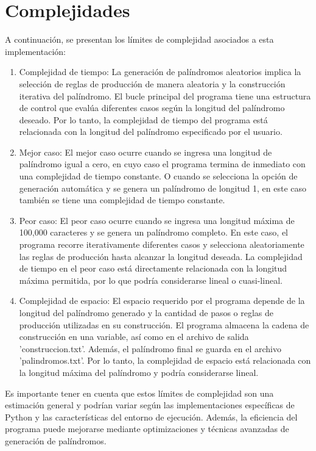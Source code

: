\section{Complejidades}
A continuación, se presentan los límites de complejidad asociados a esta implementación:
\begin{enumerate}
    
\item Complejidad de tiempo: La generación de palíndromos aleatorios implica la selección de reglas de producción de manera aleatoria y la construcción iterativa del palíndromo. El bucle principal del programa tiene una estructura de control que evalúa diferentes casos según la longitud del palíndromo deseado. Por lo tanto, la complejidad de tiempo del programa está relacionada con la longitud del palíndromo especificado por el usuario.\newline

\item Mejor caso: El mejor caso ocurre cuando se ingresa una longitud de palíndromo igual a cero, en cuyo caso el programa termina de inmediato con una complejidad de tiempo constante. O cuando se selecciona la opción de generación automática y se genera un palíndromo de longitud 1, en este caso también se tiene una complejidad de tiempo constante.\newline

\item Peor caso: El peor caso ocurre cuando se ingresa una longitud máxima de 100,000 caracteres y se genera un palíndromo completo. En este caso, el programa recorre iterativamente diferentes casos y selecciona aleatoriamente las reglas de producción hasta alcanzar la longitud deseada. La complejidad de tiempo en el peor caso está directamente relacionada con la longitud máxima permitida, por lo que podría considerarse lineal o cuasi-lineal.\newline

\item Complejidad de espacio: El espacio requerido por el programa depende de la longitud del palíndromo generado y la cantidad de pasos o reglas de producción utilizadas en su construcción. El programa almacena la cadena de construcción en una variable, así como en el archivo de salida 'construccion.txt'. Además, el palíndromo final se guarda en el archivo 'palindromos.txt'. Por lo tanto, la complejidad de espacio está relacionada con la longitud máxima del palíndromo y podría considerarse lineal.\newline
\end{enumerate}


Es importante tener en cuenta que estos límites de complejidad son una estimación general y podrían variar según las implementaciones específicas de Python y las características del entorno de ejecución. Además, la eficiencia del programa puede mejorarse mediante optimizaciones y técnicas avanzadas de generación de palíndromos.